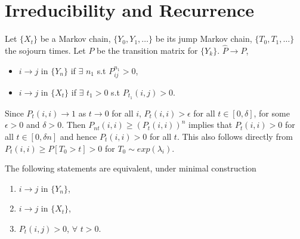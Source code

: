 \documentclass[all-lectures.tex]{subfiles}
\begin{document}

\setcounter{section}{3}
\setcounter{subsection}{0}

\section*{}

\section{Irreducibility and Recurrence}
Let $\{X_t\}$ be a Markov chain, $\{Y_0, Y_1, \dots\}$ be its jump Markov chain, $\{T_0, T_1, \dots\}$ the sojourn times. Let $P$ be the transition matrix for $\{Y_k\}$.
$\hat{P} \to P$,
\begin{itemize}
\item $i \to j$ in $\{Y_n\}$ if $\exists$ $n_1$ s.t $P^{n_1}_{ij} > 0$,
\item $i \to j$ in $\{X_t\}$ if $\exists$ $t_1 >0$ s.t $P_{t_1}(i,j) > 0$.
\end{itemize}

Since $P_t(i,i)\to 1$ as $t \to 0$ for all $i$, $P_t(i,i)  > \epsilon$ for all $t  \in [0, \delta]$, for some $\epsilon > 0$ and $\delta > 0$.
Then $P_{nt}(i,i) \ge (P_{t}(i,i))^n$ implies that $P_t(i,i)  >0$ for all $t \in [0, \delta n]$ and hence $P_t(i,i) > 0$ for all $t$.
This also follows directly from $P_t(i,i)  \geq P[T_0 >t] > 0$ for $T_0 \sim exp(\lambda_{i})$.
\begin{prop}
The following statements are equivalent, under minimal construction
\begin{enumerate}
\item $i \to j$ in $\{Y_n\}$,
\item $i \to j$ in $\{X_t\}$,
\item $P_t(i,j)  > 0 $, $\forall$ $ t>0$.
\end{enumerate}
\end{prop}
\end{document}
